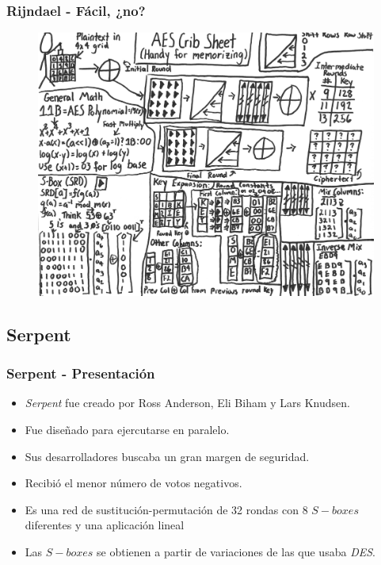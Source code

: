 \documentclass{beamer}
\begin{document}
	\begin{frame}
	\frametitle{Rijndael - Fácil, ¿no?}
	\begin{figure}
		\centering
		\includegraphics[width=0.8\linewidth]{./Images/xkcd-AES.png}
	\end{figure}
	\end{frame}
	
	\subsection{Serpent}
	\begin{frame}
	\frametitle{Serpent - Presentación}
	\begin{itemize}
		\item \textit{Serpent} fue creado por Ross Anderson, Eli Biham y Lars Knudsen.
		
		\item Fue diseñado para ejercutarse en paralelo.
			
		\item Sus desarrolladores buscaba un gran margen de seguridad.
		
		\item Recibió el menor número de votos negativos.
		
		\item Es una red de sustitución-permutación de 32 rondas con 8 $S-boxes$ diferentes y una aplicación lineal
		
		\item Las $S-boxes$ se obtienen a partir de variaciones de las que usaba \textit{DES}.
	\end{itemize}	
	\end{frame}
	
\end{document}
